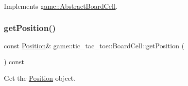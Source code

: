 Implements \hyperlink{classgame_1_1_abstract_board_cell_a3939330bed75f3a408af228e86ec93af}{game\+::\+Abstract\+Board\+Cell}.

\mbox{\label{classgame_1_1tic__tac__toe_1_1_board_cell_aa418994b5cdf5c74b105701193d72a1b}} 
\subsubsection{\texorpdfstring{get\+Position()}{getPosition()}}
{\footnotesize\ttfamily const \hyperlink{structgame_1_1_position}{Position}\& game\+::tic\+\_\+tac\+\_\+toe\+::\+Board\+Cell\+::get\+Position (\begin{DoxyParamCaption}{ }\end{DoxyParamCaption}) const\hspace{0.3cm}{\ttfamily [inline]}}



Get the \hyperlink{structgame_1_1_position}{Position} object. 

